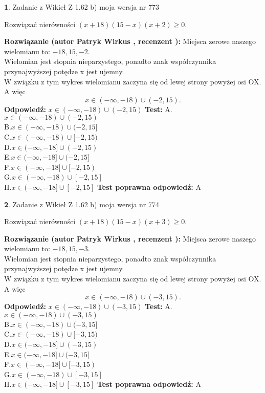 \documentclass[12pt, a4paper]{article}
\theoremstyle{definition} %
\newtheorem{zad}{}
\newcommand{\zadStart}[1]{\begin{zad}#1\newline}
\newcommand{\zadStop}{\end{zad}}
\newcommand{\rozwStart}[2]{\noindent \textbf{Rozwiązanie (autor #1 , recenzent #2): }\newline}
\newcommand{\rozwStop}{\newline}
\newcommand{\odpStart}{\noindent \textbf{Odpowiedź:}\newline}
\newcommand{\odpStop}{\newline}
\newcommand{\testStart}{\noindent \textbf{Test:}\newline}
\newcommand{\testStop}{\newline}
\newcommand{\kluczStart}{\noindent \textbf{Test poprawna odpowiedź:}\newline}
\newcommand{\kluczStop}{\newline}
\begin{document}
\zadStart{Zadanie z Wikieł Z 1.62 b) moja wersja nr 773}

Rozwiązać nierówności $(x+18)(15-x)(x+2)\ge0$.
\zadStop
\rozwStart{Patryk Wirkus}{}
Miejsca zerowe naszego wielomianu to: $-18, 15, -2$.\\
Wielomian jest stopnia nieparzystego, ponadto znak współczynnika przy\linebreak najwyższej potędze x jest ujemny.\\ W związku z tym wykres wielomianu zaczyna się od lewej strony powyżej osi OX. A więc $$x \in (-\infty,-18) \cup (-2,15).$$
\rozwStop
\odpStart
$x \in (-\infty,-18) \cup (-2,15)$
\odpStop
\testStart
A.$x \in (-\infty,-18) \cup (-2,15)$\\
B.$x \in (-\infty,-18) \cup (-2,15]$\\
C.$x \in (-\infty,-18) \cup [-2,15)$\\
D.$x \in (-\infty,-18] \cup (-2,15)$\\
E.$x \in (-\infty,-18] \cup (-2,15]$\\
F.$x \in (-\infty,-18] \cup [-2,15)$\\
G.$x \in (-\infty,-18) \cup [-2,15]$\\
H.$x \in (-\infty,-18] \cup [-2,15]$
\testStop
\kluczStart
A
\kluczStop



\zadStart{Zadanie z Wikieł Z 1.62 b) moja wersja nr 774}

Rozwiązać nierówności $(x+18)(15-x)(x+3)\ge0$.
\zadStop
\rozwStart{Patryk Wirkus}{}
Miejsca zerowe naszego wielomianu to: $-18, 15, -3$.\\
Wielomian jest stopnia nieparzystego, ponadto znak współczynnika przy\linebreak najwyższej potędze x jest ujemny.\\ W związku z tym wykres wielomianu zaczyna się od lewej strony powyżej osi OX. A więc $$x \in (-\infty,-18) \cup (-3,15).$$
\rozwStop
\odpStart
$x \in (-\infty,-18) \cup (-3,15)$
\odpStop
\testStart
A.$x \in (-\infty,-18) \cup (-3,15)$\\
B.$x \in (-\infty,-18) \cup (-3,15]$\\
C.$x \in (-\infty,-18) \cup [-3,15)$\\
D.$x \in (-\infty,-18] \cup (-3,15)$\\
E.$x \in (-\infty,-18] \cup (-3,15]$\\
F.$x \in (-\infty,-18] \cup [-3,15)$\\
G.$x \in (-\infty,-18) \cup [-3,15]$\\
H.$x \in (-\infty,-18] \cup [-3,15]$
\testStop
\kluczStart
A
\kluczStop
\end{document}
